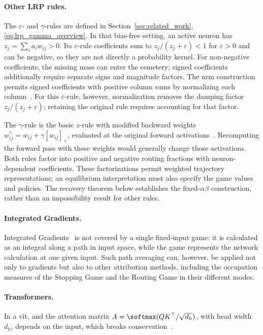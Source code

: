 \paragraph{Other LRP rules.}\label{par:other_lrp_games}
The $\varepsilon$- and $\gamma$-rules are defined in Section~\ref{sec:related_work}, \eqref{eq:lrp_gamma_overview}. In that bias-free setting, an active neuron has $z_j=\sum_i a_iw_{ij}>0$. Its $\varepsilon$-rule coefficients sum to $z_j/(z_j+\varepsilon)<1$ for $\varepsilon>0$ and can be negative, so they are not directly a probability kernel. For non-negative coefficients, the missing mass can enter the cemetery; signed coefficients additionally require separate signs and magnitude factors. The \ac{nrm} construction permits signed coefficients with positive column sums by normalizing each column~\parencite[Sections~3.3, 3.5 and Appendix~E]{Xiong2026nrm}. For this $\varepsilon$-rule, however, normalization removes the damping factor $z_j/(z_j+\varepsilon)$; retaining the original rule requires accounting for that factor.

The $\gamma$-rule is the basic $z$-rule with modified backward weights $w_{ij}^{\gamma}=w_{ij}+\gamma[w_{ij}]_+$, evaluated at the original forward activations~\parencite{Montavon_2022_gammaLRP}. Recomputing the forward pass with these weights would generally change those activations. Both rules factor into positive and negative routing fractions with neuron-dependent coefficients. These factorizations permit weighted trajectory representations; an equilibrium interpretation must also specify the game values and policies. The recovery theorem below establishes the fixed-$\alpha\beta$ construction, rather than an impossibility result for other rules.

\paragraph{Integrated Gradients.}
Integrated Gradients~\parencite{Sundararajan2017} is not covered by a single fixed-input game: it is calculated as an integral along a path in input space, while the game represents the network calculation at one given input. Such path averaging can, however, be applied not only to gradients but also to other attribution methods, including the occupation measures of the Stopping Game and the Routing Game in their different modes.

\paragraph{Transformers.} In a \acs{vit},  and the attention matrix $A = \softmax(QK^\top/\sqrt{d_h})$, with head width $d_h$,
depends on the input, which breaks conservation~\parencite{Ali2022AttnLRP}.

